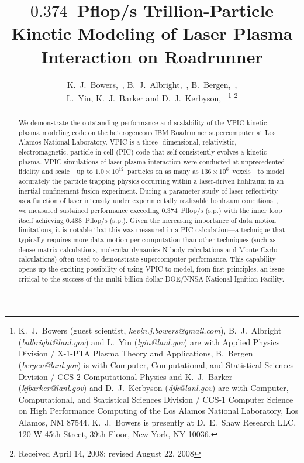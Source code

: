 \documentclass[journal,twoside]{IEEEtran}
\begin{document}
\title{$0.374$~Pflop/s Trillion-Particle Kinetic Modeling of Laser Plasma
Interaction on Roadrunner}

\author{K.~J.~Bowers,~,
        B.~J.~Albright,~,
        B.~Bergen,~, \\
        L.~Yin, %
        K.~J.~Barker %
        and D.~J.~Kerbyson,~%
\thanks{
K.~J.~Bowers (guest scientist, \emph{kevin.j.bowers@gmail.com}),
B.~J.~Albright (\emph{balbright@lanl.gov}) and L.~Yin
(\emph{lyin@lanl.gov}) are with Applied Physics Division / X-1-PTA
Plasma Theory and Applications, B.~Bergen (\emph{bergen@lanl.gov}) is
with Computer, Computational, and Statistical Sciences Division /
CCS-2 Computational Physics and K.~J.~Barker
(\emph{kjbarker@lanl.gov}) and D.~J.~Kerbyson (\emph{djk@lanl.gov})
are with Computer, Computational, and Statistical Sciences Division /
CCS-1 Computer Science on High Performance Computing of the Los Alamos
National Laboratory, Los Alamos, NM 87544.  K.~J.~Bowers is presently
at D.~E.~Shaw Research LLC, 120 W 45th Street, 39th Floor, New York,
NY 10036.}%
\thanks{Received April 14, 2008; revised August 22, 2008}
}


\maketitle

\begin{abstract}
We demonstrate the outstanding performance and scalability of the VPIC
kinetic plasma modeling code on the heterogeneous IBM Roadrunner
supercomputer at Los Alamos National Laboratory.  VPIC is a three-
dimensional, relativistic, electromagnetic, particle-in-cell (PIC)
code that self-consistently evolves a kinetic plasma.  VPIC
simulations of laser plasma interaction were conducted at
unprecedented fidelity and scale---up to $1.0 \times
10^{12}$~particles on as many as $136 \times 10^6$~voxels---to model
accurately the particle trapping physics occurring within a
laser-driven hohlraum in an inertial confinement fusion experiment.
During a parameter study of laser reflectivity as a function of laser
intensity under experimentally realizable hohlraum
conditions~\cite{AAC_Conference_Paper}, we measured sustained
performance exceeding $0.374$~Pflop/s (s.p.) with the inner loop
itself achieving $0.488$~Pflop/s (s.p.).  Given the increasing
importance of data motion limitations, it is notable that this was
measured in a PIC calculation---a technique that typically requires
more data motion per computation than other techniques (such as dense
matrix calculations, molecular dynamics N-body calculations and
Monte-Carlo calculations) often used to demonstrate supercomputer
performance.  This capability opens up the exciting possibility of
using VPIC to model, from first-principles, an issue critical to the
success of the multi-billion dollar DOE/NNSA National Ignition
Facility.
\end{abstract}
\end{document}

